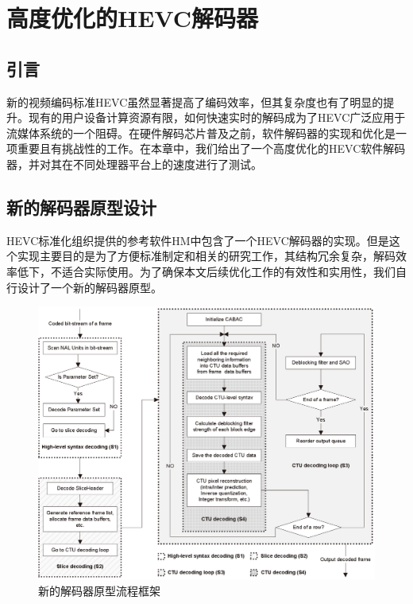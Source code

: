\chapter{高度优化的HEVC解码器}

\section{引言}

新的视频编码标准HEVC虽然显著提高了编码效率，但其复杂度也有了明显的提升。现有的用户设备计算资源有限，如何快速实时的解码成为了HEVC广泛应用于流媒体系统的一个阻碍。在硬件解码芯片普及之前，软件解码器的实现和优化是一项重要且有挑战性的工作。在本章中，我们给出了一个高度优化的HEVC软件解码器，并对其在不同处理器平台上的速度进行了测试。

\section{新的解码器原型设计}

HEVC标准化组织提供的参考软件HM中包含了一个HEVC解码器的实现。但是这个实现主要目的是为了方便标准制定和相关的研究工作，其结构冗余复杂，解码效率低下，不适合实际使用。为了确保本文后续优化工作的有效性和实用性，我们自行设计了一个新的解码器原型。

\begin{figure}[t]
	\centering
	\includegraphics[width = 1.0\linewidth]{eps/decoding_workflow}
	\caption{\label{fig:decoding_workflow}新的解码器原型流程框架}
\end{figure}

